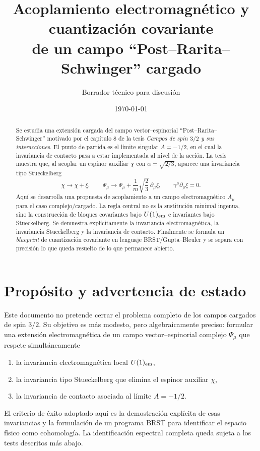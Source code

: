 \documentclass[11pt,a4paper]{article}
\title{Acoplamiento electromagnético y cuantización covariante\\de un campo ``Post--Rarita--Schwinger'' cargado}
\author{Borrador técnico para discusión}
\date{\today}
\numberwithin{equation}{section}
\newcommand{\sdel}{\gamma^\mu\partial_\mu}
\begin{document}
\maketitle

\begin{abstract}
Se estudia una extensión cargada del campo vector--espinorial ``Post--Rarita--Schwinger'' motivado por el capítulo 8 de la tesis \emph{Campos de spin $3/2$ y sus interacciones}. El punto de partida es el límite singular $A=-1/2$, en el cual la invariancia de contacto pasa a estar implementada al nivel de la acción. La tesis muestra que, al acoplar un espinor auxiliar $\chi$ con $\alpha=\sqrt{2/3}$, aparece una invariancia tipo Stueckelberg
\[
\chi\to\chi+\xi,
\qquad
\Psi_\mu\to\Psi_\mu+\frac1m\sqrt{\frac23}\,\partial_\mu\xi,
\qquad \sdel\xi=0.
\]
Aquí se desarrolla una propuesta de acoplamiento a un campo electromagnético $A_\mu$ para el caso complejo/cargado. La regla central no es la sustitución minimal ingenua, sino la construcción de bloques covariantes bajo $U(1)_{\rm em}$ e invariantes bajo Stueckelberg. Se demuestra explícitamente la invariancia electromagnética, la invariancia Stueckelberg y la invariancia de contacto. Finalmente se formula un \emph{blueprint} de cuantización covariante en lenguaje BRST/Gupta--Bleuler y se separa con precisión lo que queda resuelto de lo que permanece abierto.
\end{abstract}

\tableofcontents

\section{Propósito y advertencia de estado}
\label{sec:proposito-y-advertencia-de-estado}

Este documento no pretende cerrar el problema completo de los campos cargados de spin $3/2$. Su objetivo es más modesto, pero algebraicamente preciso: formular una extensión electromagnética de un campo vector--espinorial complejo $\Psi_\mu$ que respete simultáneamente
\begin{enumerate}[label=(\roman*)]
\item la invariancia electromagnética local $U(1)_{\rm em}$,
\item la invariancia tipo Stueckelberg que elimina el espinor auxiliar $\chi$,
\item la invariancia de contacto asociada al límite $A=-1/2$.
\end{enumerate}
El criterio de éxito adoptado aquí es la demostración explícita de esas invariancias y la formulación de un programa BRST para identificar el espacio físico como cohomología. La identificación espectral completa queda sujeta a los tests descritos más abajo.
\end{document}
